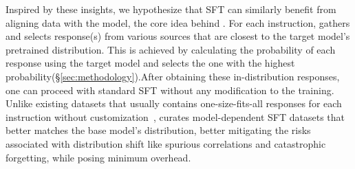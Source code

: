 Inspired by these insights,
we hypothesize that SFT can similarly benefit from aligning data with the model,
the core idea behind \name.
For each instruction, \name gathers and selects response(s) from various sources that are closest to the target model's  pretrained distribution. 
This is achieved by calculating the probability of each response using the target model and selects the one with the highest probability(\S\ref{sec:methodology}).After obtaining these in-distribution responses, one can proceed with standard SFT without any modification to the training.
Unlike existing datasets that usually contains one-size-fits-all responses for each instruction without customization~\cite{yu2024metamath, yuan2024eurus,slimorca,OpenHermes}, \name curates model-dependent SFT datasets that better matches the base model's distribution, better mitigating the risks associated with distribution shift like spurious correlations and catastrophic forgetting, while posing minimum overhead.


